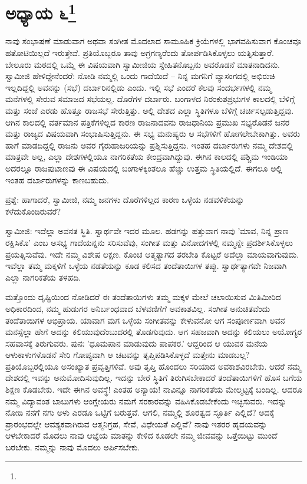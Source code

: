 \newpage

\chapter[ಅಧ್ಯಾಯ ೬]{ಅಧ್ಯಾಯ ೬\protect\footnote{}}

ನಾವು ಸಂಭಾಷಣೆ ಮಾಡುವಾಗ ಅಥವಾ ಸಂಗೀತ ಮೊದಲಾದ ಸಾಮೂಹಿಕ ಕ್ರಿಯೆಗಳಲ್ಲಿ ಭಾಗವಹಿಸುವಾಗ ಕೊಂಚವೂ ಹತೋಟಿಯಿಲ್ಲದೆ ಇರುತ್ತೇವೆ. ಪ್ರತಿಯೊಬ್ಬರೂ ತಾವು ಅಗ್ರಗಣ್ಯರೆಂದು ತೋರ್ಪಡಿಸಿಕೊಳ್ಳಲು ಯತ್ನಿಸುತ್ತಾರೆ. ಬೇಲೂರು ಮಠದಲ್ಲಿ ಒಮ್ಮೆ ಈ ವಿಷಯವಾಗಿ ಸ್ವಾಮೀಜಿಯ ಸ್ನೇಹಿತನೊಬ್ಬನು ಅವರೊಡನೆ ಮಾತನಾಡಿದನು. ಸ್ವಾಮೀಜಿ ಹೇಳಿದ್ದೇನೆಂದರೆ: ನೋಡಿ ನಮ್ಮಲ್ಲಿ ಒಂದು ಗಾದೆಯಿದೆ – ನಿನ್ನ ಮಗನಿಗೆ ವ್ಯಾಸಂಗದಲ್ಲಿ ಅಭಿರುಚಿ ಇಲ್ಲದಿದ್ದಲ್ಲಿ ಅವನನ್ನು (ಸಭೆ) ದರ್ಬಾರಿನಲ್ಲಿಡು ಎಂದು. ಇಲ್ಲಿ ಸಭೆ ಎಂದರೆ ಕೆಲವು ಸಂದರ್ಭಗಳಲ್ಲಿ ನಮ್ಮ ಮನೆಗಳಲ್ಲಿ ಸೇರುವ ಸಮಾಜದ ಸಭೆಯಲ್ಲ. ದೊರೆಗಳ ದರ್ಬಾರು. ಬಂಗಾಳದ ನಿರಂಕುಶಪ್ರಭುಗಳ ಕಾಲದಲ್ಲಿ ಬೆಳಿಗ್ಗೆ ಮತ್ತು ಸಂಜೆ ಎರಡು ಹೊತ್ತೂ ರಾಜಸಭೆ ಸೇರುತ್ತಿತ್ತು. ಅಲ್ಲಿ ದೇಶದ ಎಲ್ಲಾ ಸ್ಥಿತಿಗಳೂ ಬೆಳಿಗ್ಗೆ ಚರ್ಚಿಸಲ್ಪಡುತ್ತಿದ್ದವು. ಆಗಿನ ಕಾಲದಲ್ಲಿ ವರ್ತಮಾನ ಪತ್ರಿಕೆಗಳಿಲ್ಲದ ಕಾರಣ ರಾಜನಾದವನು ರಾಜಧಾನಿಯ ಪ್ರಮುಖ ಸಭ್ಯರೊಡನೆ ಜನರ ಮತ್ತು ರಾಜ್ಯದ ವಿಷಯವಾಗಿ ಸಂಭಾಷಿಸುತ್ತಿದ್ದನು. ಈ ಸಭ್ಯ ಮನುಷ್ಯರು ಆ ಸಭೆಗಳಿಗೆ ಹೋಗಲೇಬೇಕಾಗಿತ್ತು. ಅವರು ಹಾಗೆ ಮಾಡದಿದ್ದಲ್ಲಿ ರಾಜನು ಅವರ ಗೈರುಹಾಜರಿಯನ್ನು ಪ್ರಶ್ನಿಸುತ್ತಿದ್ದನು. ಇಂತಹ ದರ್ಬಾರುಗಳು ನಮ್ಮ ದೇಶದಲ್ಲಿ ಮಾತ್ರವೇ ಅಲ್ಲ, ಎಲ್ಲಾ ದೇಶಗಳಲ್ಲಿಯೂ ನಾಗರಿಕತೆಯ ಕೇಂದ್ರವಾಗಿದ್ದುವು. ಈಗಿನ ಕಾಲದಲ್ಲಿ ಪಶ್ಚಿಮ ಇಂಡಿಯಾ ಅದರಲ್ಲೂ ರಾಜಪುಟಾಣವು ಈ ವಿಷಯದಲ್ಲಿ ಬಂಗಾಳಕ್ಕಿಂತಲೂ ಹೆಚ್ಚು ಉತ್ತಮ ಸ್ಥಿತಿಯಲ್ಲಿದೆ. ಈಗಲೂ ಅಲ್ಲಿ ಇಂತಹ ದರ್ಬಾರುಗಳನ್ನು ಕಾಣಬಹುದು.

ಪ್ರಶ್ನೆ: ಹಾಗಾದರೆ, ಸ್ವಾಮೀಜಿ, ನಮ್ಮ ಜನಗಳು ದೊರೆಗಳಿಲ್ಲದ ಕಾರಣ ಒಳ್ಳೆಯ ನಡವಳಿಕೆಯನ್ನು ಕಳೆದುಕೊಂಡಿರುವರೆ?

ಸ್ವಾಮೀಜಿ: ಇದೆಲ್ಲಾ ಅವನತ ಸ್ಥಿತಿ. ಸ್ವಾರ್ಥವೇ ಇದರ ಮೂಲ. ಹಡಗನ್ನು ಹತ್ತುವಾಗ ನಾವು 'ಮಾವ, ನಿನ್ನ ಪ್ರಾಣ ರಕ್ಷಿಸಿಕೊ' ಎಂಬ ಅಸಭ್ಯ ಗಾದೆಯನ್ನನು ಸರಿಸುವೆವು, ಸಂಗೀತ ಮತ್ತು ವಿನೋದಗಳಲ್ಲಿ ನಮ್ಮನ್ನೇ ಪ್ರದರ್ಶಿಸಿಕೊಳ್ಳಲು ಪ್ರಯತ್ನಿಸುವೆವು. ಇದೇ ನಮ್ಮ ವಿಶೇಷ ಲಕ್ಷಣ. ಕೊಂಚ ಆತ್ಮತ್ಯಾಗದ ತರಬೇತಿ ಕೊಟ್ಟರೆ ಅದೆಲ್ಲಾ ಮಾಯವಾಗುವುದು. ಇವೆಲ್ಲಾ ತಮ್ಮ ಮಕ್ಕಳಿಗೆ ಒಳ್ಳೆಯ ನಡತೆಯನ್ನು ಕೂಡ ಕಲಿಸದ ತಂದೆತಾಯಿಗಳ ತಪ್ಪು. ಸ್ವಾರ್ಥತ್ಯಾಗವೇ ನಿಜವಾಗಿ ಎಲ್ಲಾ ನಾಗರಿಕತೆಯ ತಳಹದಿ.

ಮತ್ತೊಂದು ದೃಷ್ಟಿಯಿಂದ ನೋಡಿದರೆ ಈ ತಂದೆತಾಯಿಗಳು ತಮ್ಮ ಮಕ್ಕಳ ಮೇಲೆ ಚಲಾಯಿಸುವ ಮಿತಿಮೀರಿದ ಅಧಿಕಾರದಿಂದ, ನಮ್ಮ ಹುಡುಗರ ಅನಿರ್ಬಂಧವಾದ ಬೆಳವಣಿಗೆಗೆ ಅವಕಾಶವಿಲ್ಲ. ಸಂಗೀತ ಅನುಚಿತವೆಂದು ತಂದೆತಾಯಿಗಳ ಅಭಿಪ್ರಾಯ. ಯಾವಾಗ ಮಗ ಒಳ್ಳೆಯ ಸಂಗೀತವನ್ನು ಕೇಳುವನೋ ಆಗ ಸಂಪೂರ್ಣವಾಗಿ ಅವನ ಮನಸ್ಸೆಲ್ಲಾ ಹೇಗೆ ಅದನ್ನು ಕಲಿಯುವುದೆಂಬುದರಲ್ಲಿ ತೊಡಗುವುದು. ಆಗ ಸಹಜವಾಗಿ ಅದನ್ನು ಕಲಿಯಲು ಅಯೋಗ್ಯರ ಸಹವಾಸಕ್ಕೆ ತಿರುಗುವರು. ಪುನಃ 'ಧೂಮಪಾನ ಮಾಡುವುದು ಪಾಪಕರ.' ಆದ್ದರಿಂದ ಆ ಯುವಕ ಮನೆಯ ಆಳುಕಾಳುಗಳೊಡನೆ ಸೇರಿ ಗೋಪ್ಯವಾಗಿ ಆ ಚಟವನ್ನು ತೃಪ್ತಿಪಡಿಸಿಕೊಳ್ಳದೆ ಮತ್ತೇನು ಮಾಡಬಲ್ಲ? ಪ್ರತಿಯೊಬ್ಬರಲ್ಲಿಯೂ ಅಸಂಖ್ಯಾತ ಪ್ರವೃತ್ತಿಗಳಿವೆ. ಅವು ತೃಪ್ತಿ ಹೊಂದಲು ಸರಿಯಾದ ಅವಕಾಶವಿರಬೇಕು. ಆದರೆ ನಮ್ಮ ದೇಶದಲ್ಲಿ ಇವನ್ನು ಅನುಮೋದಿಸುವುದಿಲ್ಲ. ಇದನ್ನು ಬೇರೆ ಸ್ಥಿತಿಗೆ ತಿರುಗಿಸಬೇಕಾದರೆ ತಂದೆತಾಯಿಗಳಿಗೆ ಹೊಸ ಬಗೆಯ ಶಿಕ್ಷಣ ಕೊಡಬೇಕು. ಇದೇ ಈಗಿನ ಅವಸ್ಥೆ! ಎಂತಹ ಅನ್ಯಾಯ! ನಾವಿನ್ನೂ ನಾಗರಿಕತೆಯ ಮೇಲ್ಮಟ್ಟಕ್ಕೆ ಬಂದಿಲ್ಲ. ಆದರೂ ನಮ್ಮ ವಿದ್ಯಾವಂತ ಬಾಬುಗಳು ಆಂಗ್ಲೇಯರು ನಮಗೆ ಸರಕಾರವನ್ನು ವಹಿಸಿಕೊಡಬೇಕೆಂದು ಇಚ್ಛಿಸುವರು. ಇದನ್ನು ನೋಡಿ ನನಗೆ ನಗು ಅಳು ಎರಡೂ ಒಟ್ಟಿಗೆ ಬರುತ್ತವೆ. ಆಗಲಿ, ನಮ್ಮಲ್ಲಿ ಶೂರತ್ವದ ಸ್ಫೂರ್ತಿ ಎಲ್ಲಿದೆ? ಅದಕ್ಕೆ ಪ್ರಾರಂಭದಲ್ಲೇ ಆವಶ್ಯಕವಾಗಿರುವ ಆತ್ಮನಿಗ್ರಹ, ಸೇವೆ, ವಿಧೇಯತೆ ಎಲ್ಲಿವೆ? ನಾವು ಇತರರ ಹೃದಯವನ್ನು ಆಳಬೇಕಾದರೆ ಮೊದಲು ನಾವು ಆಜ್ಞೆಯ ಮಾತನ್ನು ಕೇಳಿದ ಕೂಡಲೇ ನಮ್ಮ ಜೀವವನ್ನು ಒತ್ತೆಯಿಟ್ಟು ಮುಂದೆ ಬರಬೇಕು. ನಮ್ಮನ್ನು ನಾವು ಮೊದಲು ಅರ್ಪಿಸಬೇಕು.

